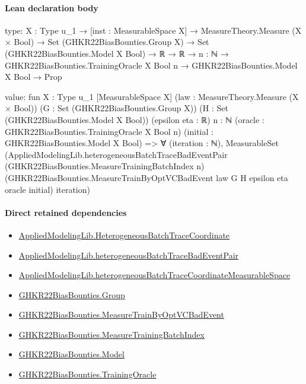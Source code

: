 \documentclass[10pt]{article}
\begin{document}
\paragraph{Lean declaration body}
\begin{ReviewVerbatim}
type:
{X : Type u_1} →
  [inst : MeasurableSpace X] →
    MeasureTheory.Measure (X × Bool) →
      Set (GHKR22BiasBounties.Group X) →
        Set (GHKR22BiasBounties.Model X Bool) →
          ℝ → ℝ → {n : ℕ} → GHKR22BiasBounties.TrainingOracle X Bool n → GHKR22BiasBounties.Model X Bool → Prop

value:
fun {X : Type u_1} [MeasurableSpace X] (law : MeasureTheory.Measure (X × Bool)) (G : Set (GHKR22BiasBounties.Group X))
    (H : Set (GHKR22BiasBounties.Model X Bool)) (epsilon eta : ℝ) {n : ℕ}
    (oracle : GHKR22BiasBounties.TrainingOracle X Bool n) (initial : GHKR22BiasBounties.Model X Bool) =>
  ∀ (iteration : ℕ),
    MeasurableSet
      (AppliedModelingLib.heterogeneousBatchTraceBadEventPair (GHKR22BiasBounties.MeasureTrainingBatchIndex n)
        (GHKR22BiasBounties.MeasureTrainByOptVCBadEvent law G H epsilon eta oracle initial) iteration)
\end{ReviewVerbatim}

\paragraph{Direct retained dependencies}
\begin{itemize}\raggedright
\item \hyperlink{governing-declaration-37d7ae049de215a7}{Applied\allowbreak{}Modeling\allowbreak{}Lib.\allowbreak{}Heterogeneous\allowbreak{}Batch\allowbreak{}Trace\allowbreak{}Coordinate}
\item \hyperlink{governing-declaration-68ef005103543934}{Applied\allowbreak{}Modeling\allowbreak{}Lib.\allowbreak{}heterogeneous\allowbreak{}Batch\allowbreak{}Trace\allowbreak{}Bad\allowbreak{}Event\allowbreak{}Pair}
\item \hyperlink{governing-declaration-92d1582063c434f3}{Applied\allowbreak{}Modeling\allowbreak{}Lib.\allowbreak{}heterogeneous\allowbreak{}Batch\allowbreak{}Trace\allowbreak{}Coordinate\allowbreak{}Measurable\allowbreak{}Space}
\item \hyperlink{paper-prerequisite-cc7214115b27106f}{GHKR22\allowbreak{}Bias\allowbreak{}Bounties.\allowbreak{}Group}
\item \hyperlink{governing-declaration-c8e58b992715d345}{GHKR22\allowbreak{}Bias\allowbreak{}Bounties.\allowbreak{}Measure\allowbreak{}Train\allowbreak{}By\allowbreak{}Opt\allowbreak{}VC\allowbreak{}Bad\allowbreak{}Event}
\item \hyperlink{governing-declaration-dc25f678adad672d}{GHKR22\allowbreak{}Bias\allowbreak{}Bounties.\allowbreak{}Measure\allowbreak{}Training\allowbreak{}Batch\allowbreak{}Index}
\item \hyperlink{paper-prerequisite-333127605c12eba8}{GHKR22\allowbreak{}Bias\allowbreak{}Bounties.\allowbreak{}Model}
\item \hyperlink{governing-declaration-e07f2849e71306e6}{GHKR22\allowbreak{}Bias\allowbreak{}Bounties.\allowbreak{}Training\allowbreak{}Oracle}
\end{itemize}
\clearpage
\hypertarget{library-section-5573d0c431c68f22}{}
\end{document}
